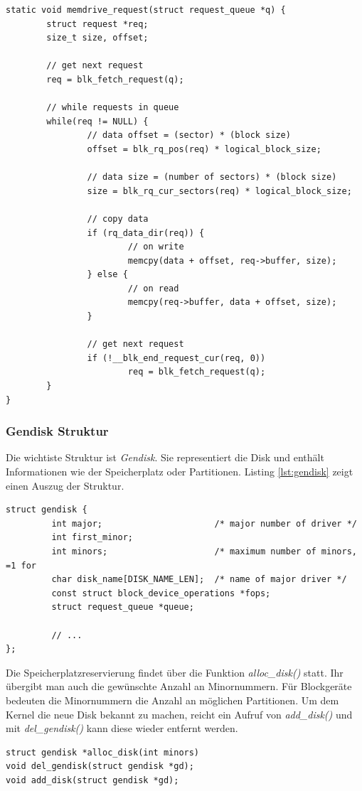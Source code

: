 \begin{lstlisting}[label=lst:blk_rq_handler,caption=Request Queue - Handler-Funktion]
static void memdrive_request(struct request_queue *q) {
        struct request *req;
        size_t size, offset;

        // get next request
        req = blk_fetch_request(q);

        // while requests in queue
        while(req != NULL) {
                // data offset = (sector) * (block size)
                offset = blk_rq_pos(req) * logical_block_size;

                // data size = (number of sectors) * (block size)
                size = blk_rq_cur_sectors(req) * logical_block_size;

                // copy data
                if (rq_data_dir(req)) {
                        // on write
                        memcpy(data + offset, req->buffer, size);
                } else {
                        // on read
                        memcpy(req->buffer, data + offset, size);
                }

                // get next request
                if (!__blk_end_request_cur(req, 0))
                        req = blk_fetch_request(q);
        }
}
\end{lstlisting}

\subsubsection{Gendisk Struktur}

Die wichtiste Struktur ist \emph{Gendisk}. Sie representiert die Disk und enthält Informationen wie der Speicherplatz oder Partitionen. Listing \ref{lst:gendisk} zeigt einen
Auszug der Struktur.
\begin{lstlisting}[label=lst:gendisk,caption=include/linux/genhd.h]
struct gendisk {
         int major;                      /* major number of driver */
         int first_minor;
         int minors;                     /* maximum number of minors, =1 for
         char disk_name[DISK_NAME_LEN];  /* name of major driver */
         const struct block_device_operations *fops;
         struct request_queue *queue;

         // ...
};
\end{lstlisting} \hfill

Die Speicherplatzreservierung findet über die Funktion \emph{alloc\_disk()} statt. Ihr übergibt man auch die gewünschte Anzahl an Minornummern. Für Blockgeräte bedeuten die Minornummern
die Anzahl an möglichen Partitionen. Um dem Kernel die neue Disk bekannt zu machen, reicht ein Aufruf von \emph{add\_disk()} und mit \emph{del\_gendisk()} kann diese wieder entfernt werden.
\begin{lstlisting}[caption=Gendisk Funktionen]
struct gendisk *alloc_disk(int minors)
void del_gendisk(struct gendisk *gd);
void add_disk(struct gendisk *gd);
\end{lstlisting}

